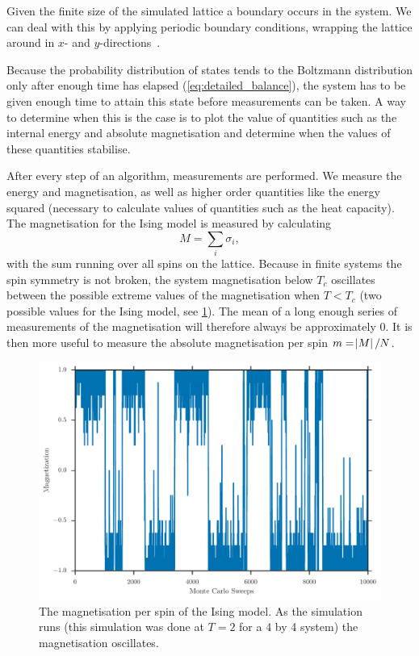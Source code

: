 \documentclass[11pt, a4paper]{report} %
\begin{document}
Given the finite size of the simulated lattice a boundary occurs in the system.
We can deal with this by applying periodic boundary conditions, wrapping the lattice around in \(x\)- and \(y\)-directions~\cite{landau:2015}.

Because the probability distribution of states tends to the Boltzmann distribution only after enough time has elapsed (\cref{eq:detailed_balance}), the system has to be given enough time to attain this state before measurements can be taken.
A way to determine when this is the case is to plot the value of quantities such as the internal energy and absolute magnetisation and determine when the values of these quantities stabilise.

After every step of an algorithm, measurements are performed.
We measure the energy and magnetisation, as well as higher order quantities like the energy squared (necessary to calculate values of quantities such as the heat capacity).
The magnetisation for the Ising model is measured by calculating
\begin{equation}
	M = \sum_i \sigma_i,
\end{equation}
with the sum running over all spins on the lattice.
Because in finite systems the spin symmetry is not broken, the system magnetisation below \(T_c\) oscillates between the possible extreme values of the magnetisation when \(T<T_c\) (two possible values for the Ising model, see \cref{fig:ising_4by4_magnetization_history}).
The mean of a long enough series of measurements of the magnetisation will therefore always be approximately 0.
It is then more useful to measure the absolute magnetisation per spin \(m = \abs{M} / N\).
\begin{figure}
	\includegraphics[width=\linewidth]{ising_4by4_magnetization_history.pdf}
	\caption{The magnetisation per spin of the Ising model. As the simulation runs (this simulation was done at \(T=2\) for a 4 by 4 system) the magnetisation oscillates.}
	\label{fig:ising_4by4_magnetization_history}
\end{figure}
\end{document}
